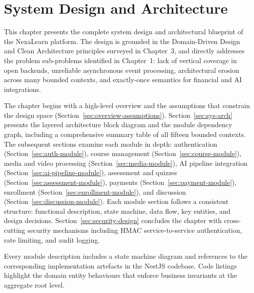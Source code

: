 
\chapter{System Design and Architecture}
\label{ch:system-design}

This chapter presents the complete system design and architectural blueprint of the NexaLearn platform. The design is grounded in the Domain-Driven Design and Clean Architecture principles surveyed in Chapter~3, and directly addresses the problem sub-problems identified in Chapter~1: lack of vertical coverage in open backends, unreliable asynchronous event processing, architectural erosion across many bounded contexts, and exactly-once semantics for financial and AI integrations.

The chapter begins with a high-level overview and the assumptions that constrain the design space (Section~\ref{sec:overview-assumptions}). Section~\ref{sec:sys-arch} presents the layered architecture block diagram and the module dependency graph, including a comprehensive summary table of all fifteen bounded contexts. The subsequent sections examine each module in depth: authentication (Section~\ref{sec:auth-module}), course management (Section~\ref{sec:course-module}), media and video processing (Section~\ref{sec:media-module}), AI pipeline integration (Section~\ref{sec:ai-pipeline-module}), assessment and quizzes (Section~\ref{sec:assessment-module}), payments (Section~\ref{sec:payment-module}), enrollment (Section~\ref{sec:enrollment-module}), and discussion (Section~\ref{sec:discussion-module}). Each module section follows a consistent structure: functional description, state machine, data flow, key entities, and design decisions. Section~\ref{sec:security-design} concludes the chapter with cross-cutting security mechanisms including HMAC service-to-service authentication, rate limiting, and audit logging.

Every module description includes a state machine diagram and references to the corresponding implementation artefacts in the NestJS codebase. Code listings highlight the domain entity behaviours that enforce business invariants at the aggregate root level.












